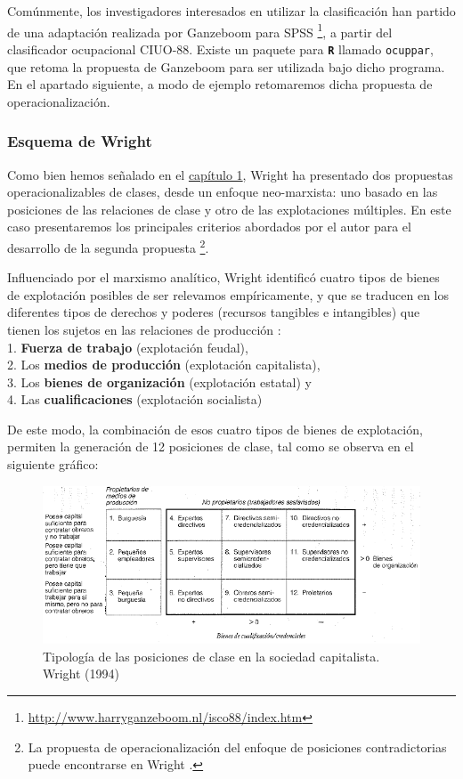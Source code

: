 \documentclass[
]{book}
\begin{document}
Comúnmente, los investigadores interesados en utilizar la clasificación han partido de una adaptación realizada por Ganzeboom para SPSS \footnote{\url{http://www.harryganzeboom.nl/isco88/index.htm}}, a partir del clasificador ocupacional CIUO-88. Existe un paquete para \textbf{\texttt{R}} llamado \texttt{ocuppar}, que retoma la propuesta de Ganzeboom para ser utilizada bajo dicho programa. En el apartado siguiente, a modo de ejemplo retomaremos dicha propuesta de operacionalización.

\hypertarget{esquema-de-wright}{%
\subsubsection{Esquema de Wright}\label{esquema-de-wright}}

Como bien hemos señalado en el \protect\hyperlink{estructura1}{capítulo 1}, Wright ha presentado dos propuestas operacionalizables de clases, desde un enfoque neo-marxista: uno basado en las posiciones de las relaciones de clase y otro de las explotaciones múltiples. En este caso presentaremos los principales criterios abordados por el autor para el desarrollo de la segunda propuesta \footnote{La propuesta de operacionalización del enfoque de posiciones contradictorias puede encontrarse en Wright \citeyearpar{Wright1979}.}.

Influenciado por el marxismo analítico, Wright identificó cuatro tipos de bienes de explotación posibles de ser relevamos empíricamente, y que se traducen en los diferentes tipos de derechos y poderes (recursos tangibles e intangibles) que tienen los sujetos en las relaciones de producción \citep{Wright2005}:\\
1. \textbf{Fuerza de trabajo} (explotación feudal),\\
2. Los \textbf{medios de producción} (explotación capitalista),\\
3. Los \textbf{bienes de organización} (explotación estatal) y\\
4. Las \textbf{cualificaciones} (explotación socialista)

De este modo, la combinación de esos cuatro tipos de bienes de explotación, permiten la generación de 12 posiciones de clase, tal como se observa en el siguiente gráfico:

\begin{figure}

{\centering \includegraphics[width=0.8\linewidth]{imagenes/wright1} 

}

\caption{Tipología de las posiciones de clase en la sociedad capitalista. Wright (1994)}\label{fig:unnamed-chunk-59}
\end{figure}
\end{document}
